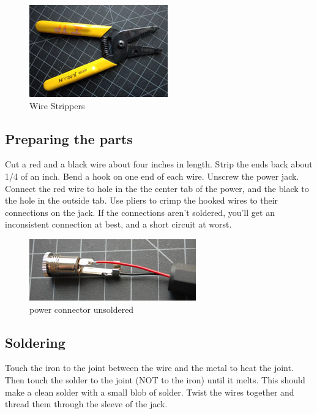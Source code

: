 \begin{figure}[!htb]
     \centering
     \includegraphics[scale=0.3]{img/soldering/wire_strippers.jpg}
     \caption{Wire Strippers}
     \label{Wire Strippers}
\end{figure}

\subsection{Preparing the parts}

Cut a red and a black wire about four inches in length. Strip the ends back about 1/4 of an inch. Bend a hook on one end of each wire. Unscrew the power jack. Connect the red wire to hole in the the center tab of the power, and the black to the hole in the outside tab. Use pliers to crimp the hooked wires to their connections on the jack. If the connections aren't soldered, you'll get an inconsistent connection at best, and a short circuit at worst.

\begin{figure}[!htb]
     \centering
     \includegraphics[scale=0.8]{img/soldering/power_connector_unsoldered.jpg}
     \caption{power connector unsoldered}
     \label{power connector unsoldered}
\end{figure}

\subsection{Soldering}

Touch the iron to the joint between the wire and the metal to heat the joint. Then touch the solder to the joint (NOT to the iron) until it melts. This should make a clean solder with a small blob of solder. Twist the wires together and thread them through the sleeve of the jack.

